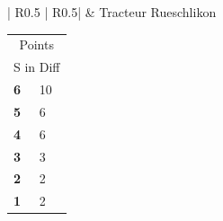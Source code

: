 \documentclass[a4paper,10pt]{scrartcl}
\begin{document}
\begin{minipage}{0.95\linewidth}
  \begin{tabular}{| R{0.5\linewidth} |  R{0.5\linewidth}|}
    \bottomrule{} & Tracteur Rueschlikon \\
    \toprule
  \end{tabular}
  \begin{minipage}{0.09\linewidth}
    \begin{tabular}{l l}
      \multicolumn{2}{c}{
        Points }                    \\
      \multicolumn{2}{c}{S in Diff} \\
      \midrule
      
      \textbf{ 6 } & 10 \\ 
      
      \textbf{ 5 } & 6 \\ 
      
      \textbf{ 4 } & 6 \\ 
      
      \textbf{ 3 } & 3 \\ 
      
      \textbf{ 2 } & 2 \\ 
      
      \textbf{ 1 } & 2 \\ 
      

\end{tabular}
\end{minipage}
\end{minipage}
\end{document}
